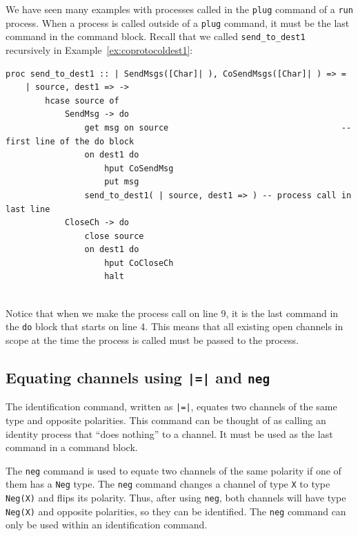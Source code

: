 \documentclass[acmsmall]{acmart}
\begin{document}
We have seen many examples with processes called in the \lstinline$plug$ command of a \lstinline$run$ process.
When a process is called outside of a \lstinline$plug$ command, it must be the last command in the command block.
Recall that we called \lstinline$send_to_dest1$ recursively in Example~\ref{ex:coprotocoldest1}:
\begin{lstlisting} 
proc send_to_dest1 :: | SendMsgs([Char]| ), CoSendMsgs([Char]| ) => =
	| source, dest1 => -> 
		hcase source of				
			SendMsg -> do							
				get msg on source 									-- first line of the do block
				on dest1 do
					hput CoSendMsg		
					put msg
				send_to_dest1( | source, dest1 => )	-- process call in last line
			CloseCh -> do
				close source
				on dest1 do
					hput CoCloseCh
					halt
				
\end{lstlisting}
Notice that when we make the process call on line 9, it is the last command in the \lstinline$do$ block that starts on line 4.
This means that all existing open channels in scope at the time the process is called must be passed to the process.


\subsection{Equating channels using \lstinline$|=|$ and \lstinline$neg$}
\label{sec:neg}

The identification command, written as \lstinline$|=|$, equates two channels of the same type and opposite polarities.
This command can be thought of as calling an identity process that ``does nothing'' to a channel.
It must be used as the last command in a command block.

The \lstinline$neg$ command is used to equate two channels of the same polarity if one of them has a \lstinline$Neg$ type.
The \lstinline$neg$ command changes a channel of type \lstinline$X$ to type \lstinline$Neg(X)$ and flips its polarity. 
Thus, after using \lstinline$neg$, both channels will have type \lstinline$Neg(X)$ and opposite polarities, so they can be identified.
The \lstinline$neg$ command can only be used within an identification command.
\end{document}
